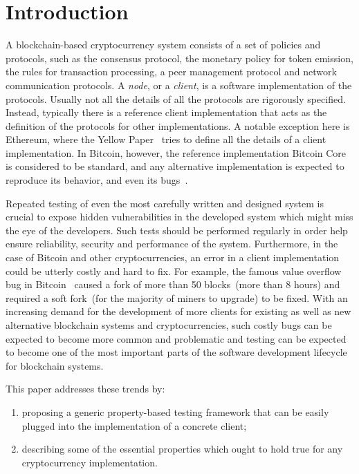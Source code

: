 
\section{Introduction}

A blockchain-based cryptocurrency system consists of a set of policies and protocols, such as the consensus protocol, the monetary policy for token emission, the rules for transaction processing, a peer management protocol and network communication protocols. A \emph{node}, or a {\em client}, is a software implementation of the protocols. Usually not all the details of all the protocols are rigorously specified. Instead, typically there is a reference client implementation that acts as the  definition of the protocols for other implementations. A notable exception here is Ethereum, where the Yellow Paper~\cite{ethyp} tries to define all the details of a client implementation. In Bitcoin, however, the reference implementation Bitcoin Core is considered to be standard, and any alternative implementation is expected to reproduce its behavior, and even its bugs~\cite{bitbugs}.

Repeated testing of even the most carefully written and designed system is crucial to expose hidden vulnerabilities in the developed system which might miss the eye of the developers. Such tests should be performed regularly in order help ensure reliability, security and performance of the system. Furthermore, in the case of Bitcoin and other cryptocurrencies, an error in a client implementation could be utterly costly and hard to fix. For example, the famous value overflow bug in Bitcoin~\cite{overflow} caused a fork of more than 50 blocks~(more than 8 hours) and required a soft fork~(for the majority of miners to upgrade) to be fixed. With an increasing demand for the development of more clients for existing as well as new alternative blockchain systems and cryptocurrencies, such costly bugs can be expected to become more common and problematic and testing can be expected to become one of the most important parts of the software development lifecycle for blockchain systems.

This paper addresses these trends by:
\begin{enumerate}
\item proposing a generic property-based testing framework that can be easily plugged into the implementation of a concrete client;
\item describing some of the essential properties which ought to hold true for any cryptocurrency implementation.
\end{enumerate}

